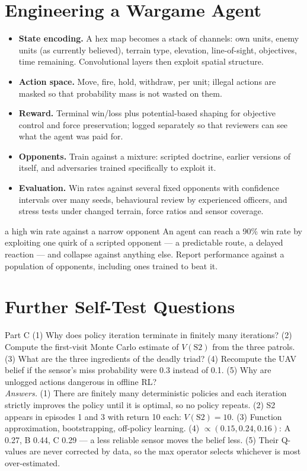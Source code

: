 \documentclass[11pt]{article}
\begin{document}
\section{Engineering a Wargame Agent}
\begin{itemize}
\item \textbf{State encoding.} A hex map becomes a stack of channels: own units, enemy units (as currently believed), terrain type, elevation, line-of-sight, objectives, time remaining. Convolutional layers then exploit spatial structure.
\item \textbf{Action space.} Move, fire, hold, withdraw, per unit; illegal actions are masked so that probability mass is not wasted on them.
\item \textbf{Reward.} Terminal win/loss plus potential-based shaping for objective control and force preservation; logged separately so that reviewers can see what the agent was paid for.
\item \textbf{Opponents.} Train against a mixture: scripted doctrine, earlier versions of itself, and adversaries trained specifically to exploit it.
\item \textbf{Evaluation.} Win rates against several fixed opponents with confidence intervals over many seeds, behavioural review by experienced officers, and stress tests under changed terrain, force ratios and sensor coverage.
\end{itemize}
\begin{pitfall}{a high win rate against a narrow opponent}
An agent can reach a 90\% win rate by exploiting one quirk of a scripted opponent --- a predictable route, a delayed reaction --- and collapse against anything else. Report performance against a population of opponents, including ones trained to beat it.
\end{pitfall}

\section{Further Self-Test Questions}
\begin{question}{Part C}
(1) Why does policy iteration terminate in finitely many iterations? (2) Compute the first-visit Monte Carlo estimate of $V(\text{S2})$ from the three patrols. (3) What are the three ingredients of the deadly triad? (4) Recompute the UAV belief if the sensor's miss probability were 0.3 instead of 0.1. (5) Why are unlogged actions dangerous in offline RL?\\
\textit{Answers.} (1) There are finitely many deterministic policies and each iteration strictly improves the policy until it is optimal, so no policy repeats. (2) S2 appears in episodes 1 and 3 with return 10 each: $V(\text{S2})=10$. (3) Function approximation, bootstrapping, off-policy learning. (4) $\propto(0.15,0.24,0.16)$: A 0.27, B 0.44, C 0.29 --- a less reliable sensor moves the belief less. (5) Their Q-values are never corrected by data, so the max operator selects whichever is most over-estimated.
\end{question}
\end{document}
